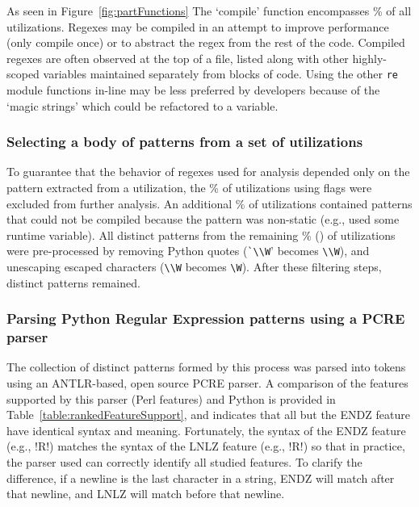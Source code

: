 As seen in Figure~\ref{fig:partFunctions} The `compile' function encompasses \% of all utilizations.  Regexes may be compiled in an attempt to improve performance (only compile once) or to abstract the regex from the rest of the code.  Compiled regexes are often observed at the top of a file, listed along with other highly-scoped variables maintained separately from blocks of code.  Using the other {\tt re} module functions in-line may be less preferred by developers because of the `magic strings' which could be refactored to a variable.

\subsubsection{Selecting a body of patterns from a set of utilizations}
To guarantee that the behavior of regexes used for analysis depended only on the pattern extracted from a utilization, the \%  of utilizations using flags were excluded from further analysis.  An additional \% of utilizations contained patterns that could not be compiled because the pattern was non-static (e.g., used some runtime variable).
All distinct patterns from the remaining \% () of utilizations were pre-processed by removing Python quotes (\verb!`\\W!' becomes \verb!\\W!), and unescaping escaped characters (\verb!\\W! becomes \verb!\W!).  After these filtering steps,  distinct patterns remained.

\subsubsection{Parsing Python Regular Expression patterns using a PCRE parser}
The collection of distinct patterns formed by this process was parsed into tokens using an ANTLR-based, open source PCRE parser.  A comparison of the features supported by this parser (Perl features) and Python is provided in Table~\ref{table:rankedFeatureSupport}, and indicates that all but the ENDZ feature have identical syntax and meaning.  Fortunately, the syntax of the ENDZ feature (e.g., \cverb!R\Z!) matches the syntax of the LNLZ feature (e.g., \cverb!R\Z!) so that in practice, the parser used can correctly identify all studied features.  To clarify the difference, if a newline is the last character in a string, ENDZ will match after that newline, and LNLZ will match before that newline.

